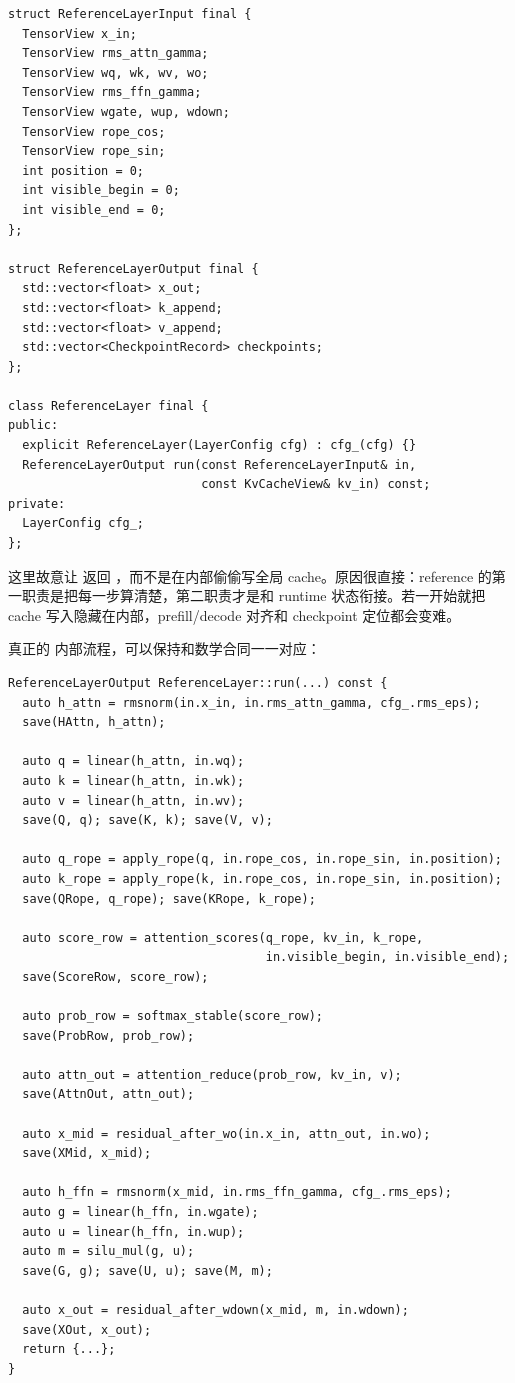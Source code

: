 \begin{lstlisting}[numbers=none,caption={ReferenceLayer::run 的责任边界}]
struct ReferenceLayerInput final {
  TensorView x_in;
  TensorView rms_attn_gamma;
  TensorView wq, wk, wv, wo;
  TensorView rms_ffn_gamma;
  TensorView wgate, wup, wdown;
  TensorView rope_cos;
  TensorView rope_sin;
  int position = 0;
  int visible_begin = 0;
  int visible_end = 0;
};

struct ReferenceLayerOutput final {
  std::vector<float> x_out;
  std::vector<float> k_append;
  std::vector<float> v_append;
  std::vector<CheckpointRecord> checkpoints;
};

class ReferenceLayer final {
public:
  explicit ReferenceLayer(LayerConfig cfg) : cfg_(cfg) {}
  ReferenceLayerOutput run(const ReferenceLayerInput& in,
                           const KvCacheView& kv_in) const;
private:
  LayerConfig cfg_;
};
\end{lstlisting}

这里故意让  返回 ，而不是在内部偷偷写全局 cache。原因很直接：reference 的第一职责是把每一步算清楚，第二职责才是和 runtime 状态衔接。若一开始就把 cache 写入隐藏在内部，prefill/decode 对齐和 checkpoint 定位都会变难。

真正的  内部流程，可以保持和数学合同一一对应：

\begin{lstlisting}[numbers=none,caption={ReferenceLayer::run 的最小伪代码}]
ReferenceLayerOutput ReferenceLayer::run(...) const {
  auto h_attn = rmsnorm(in.x_in, in.rms_attn_gamma, cfg_.rms_eps);
  save(HAttn, h_attn);

  auto q = linear(h_attn, in.wq);
  auto k = linear(h_attn, in.wk);
  auto v = linear(h_attn, in.wv);
  save(Q, q); save(K, k); save(V, v);

  auto q_rope = apply_rope(q, in.rope_cos, in.rope_sin, in.position);
  auto k_rope = apply_rope(k, in.rope_cos, in.rope_sin, in.position);
  save(QRope, q_rope); save(KRope, k_rope);

  auto score_row = attention_scores(q_rope, kv_in, k_rope,
                                    in.visible_begin, in.visible_end);
  save(ScoreRow, score_row);

  auto prob_row = softmax_stable(score_row);
  save(ProbRow, prob_row);

  auto attn_out = attention_reduce(prob_row, kv_in, v);
  save(AttnOut, attn_out);

  auto x_mid = residual_after_wo(in.x_in, attn_out, in.wo);
  save(XMid, x_mid);

  auto h_ffn = rmsnorm(x_mid, in.rms_ffn_gamma, cfg_.rms_eps);
  auto g = linear(h_ffn, in.wgate);
  auto u = linear(h_ffn, in.wup);
  auto m = silu_mul(g, u);
  save(G, g); save(U, u); save(M, m);

  auto x_out = residual_after_wdown(x_mid, m, in.wdown);
  save(XOut, x_out);
  return {...};
}
\end{lstlisting}


